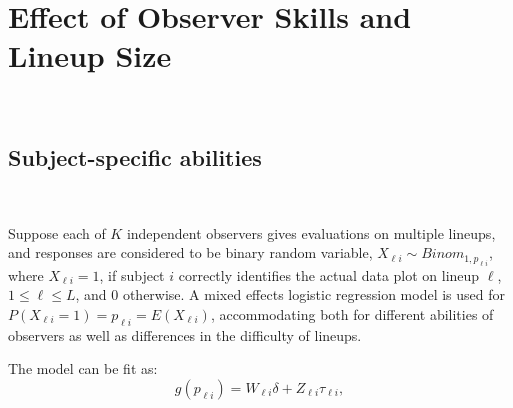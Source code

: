 \documentclass[12pt]{article}
\newcommand{\red}[1]{{\color{red} #1}}
\newcommand{\green}[1]{{\color{green} #1}} %
\begin{document}
\section{Effect of Observer Skills and Lineup Size}~\label{sec:size}



\subsection{Subject-specific abilities}~\label{sec:model}

Suppose each of $K$ independent observers gives evaluations on multiple lineups, and responses are considered to be binary random variable, $X_{\ell i} \sim  Binom_{1, p_{\ell i}}$, where $X_{\ell i} = 1$, if subject $i$ correctly identifies the actual data plot on lineup $\ell$, $1 \le \ell \le L$, and 0 otherwise. A mixed effects logistic regression model is used for $P(X_{\ell i} = 1) =  p_{\ell i} = E(X_{\ell i})$, accommodating both for different abilities of observers as well as differences in the difficulty of lineups.

The model can be  fit as:%
\begin{equation} \label{eqn:mixed}
g( p_{\ell i} )= W_{\ell i} \delta +  Z_{\ell i}  \tau_{\ell i},  
\end{equation}
\end{document}
